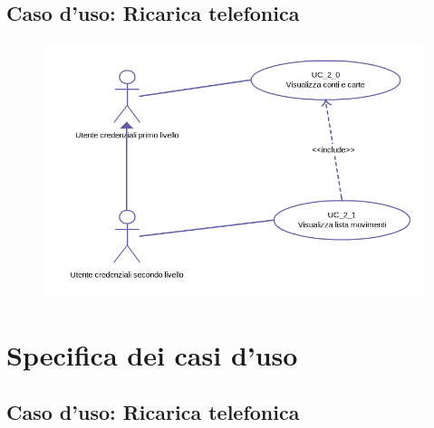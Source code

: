   \subsection{Caso d'uso: Ricarica telefonica}
 	\begin{figure}[!htbp]
	  \centering
	  \includegraphics[scale=0.60]{casi_uso/conti.png}
	\end{figure}
	
\newpage

 \section{Specifica dei casi d'uso}
 
 \subsection{Caso d'uso: Ricarica telefonica}

